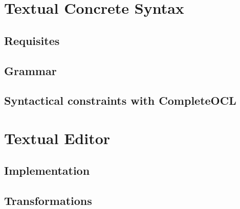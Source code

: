 \documentclass[
	10pt,				%
	oneside,
	a4paper,			%
	brazil,
	english
	]{abntex2}
\begin{document}
\chapter{Textual Concrete Syntax}

\section{Requisites}

\section{Grammar}

\section{Syntactical constraints with CompleteOCL}

\chapter{Textual Editor}

\section{Implementation}

\section{Transformations}

%
%
%
%
%

\end{document}
